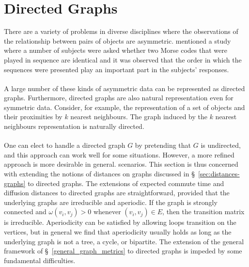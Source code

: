 \documentclass[10pt,twocolumn]{article}
\numberwithin{equation}{section}
\begin{document}
\section{Directed Graphs}
\label{sec:dist-direct-graphs}
There are a variety of problems in diverse disciplines where the
observations of the relationship between pairs of objects are
asymmetric. \cite{rothkopf57} mentioned a study where a number of
subjects were asked whether two Morse codes that were played in
sequence are identical and it was observed that the order in which the
sequences were presented play an important part in the subjects'
responses. \\ \\
\noindent
A large number of these kinds of asymmetric data can be represented as
directed graphs. Furthermore, directed graphs are also natural
representation even for symmetric data. Consider, for example, the
representation of a set of objects and their proximities by $k$
nearest neighbours. The graph induced by the $k$ nearest neighbours
representation is naturally directed. \\ \\
%
\noindent
One can elect to handle a directed graph $G$ by pretending that $G$ is
undirected, and this approach can work well for some situations.
However, a more refined approach is more desirable in general.
scenarios.  This section is thus concerned with extending the notions
of distances on graphs discussed in \S~\ref{sec:distances-graphs} to
directed graphs. The extensions of expected commute time and diffusion
distances to directed graphs are straightforward, provided that the
underlying graphs are irreducible and aperiodic. If the graph is
strongly connected and $\omega(v_i,v_j) > 0$ whenever $(v_i,v_j) \in
E$, then the transition matrix is irreducible.  Aperiodicity can be
satisfied by allowing loops transition on the vertices, but in general
we find that aperiodicity usually holds as long as the underlying
graph is not a tree, a cycle, or bipartite.  The extension of the
general framework of \S~\ref{general_graph_metrics} to directed graphs
is impeded by some fundamental difficulties.
\end{document}
